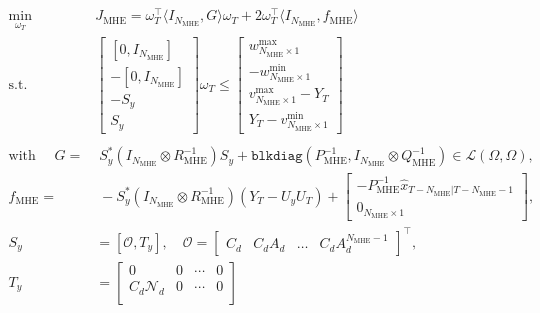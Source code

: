 \begin{equation} \label{eq:MHE_QP}
    \begin{aligned}
        \min_{\omega_T} \quad & J_{\mathrm{MHE}} = \omega_T^\top \langle I_{N_{\mathrm{MHE}}}, G \rangle \omega_T + 2 \omega_T^\top \langle I_{N_{\mathrm{MHE}}}, f_{\mathrm{MHE}} \rangle \\
        \text{s.t.} \quad &
        \begin{bmatrix}
        [0 , I_{N_{\mathrm{MHE}}}] \\
        -[0 , I_{N_{\mathrm{MHE}}}] \\
        -S_y \\
        S_y
        \end{bmatrix}
        \omega_T
        \leq
        \begin{bmatrix}
        w^{\max}_{{N_{\mathrm{MHE}}} \times 1} \\
        -w^{\min}_{{N_{\mathrm{MHE}}} \times 1} \\
        v^{\max}_{{N_{\mathrm{MHE}}} \times 1} - Y_T \\
        Y_T - v^{\min}_{{N_{\mathrm{MHE}}} \times 1}
        \end{bmatrix} \\
        \\
        \text{with } \quad
        G = &\; S_y^\ast (I_{N_{\mathrm{MHE}}} \otimes R_{\mathrm{MHE}}^{-1}) S_y + \texttt{blkdiag}(P_{\mathrm{MHE}}^{-1}, I_{N_{\mathrm{MHE}}} \otimes Q_{\mathrm{MHE}}^{-1}) \in \mathcal{L}(\Omega,\Omega), \\[1ex]
        f_{\mathrm{MHE}} = &\; -S_y^\ast (I_{N_{\mathrm{MHE}}} \otimes R_{\mathrm{MHE}}^{-1}) (Y_T - U_y U_T) + 
        \begin{bmatrix}
        -P_{\mathrm{MHE}}^{-1} \hat{x}_{T-{N_{\mathrm{MHE}}}|T-{N_{\mathrm{MHE}}}-1} \\
        0_{{N_{\mathrm{MHE}}} \times 1}
        \end{bmatrix}, \\[1ex]
        S_y &= [\mathcal{O}, T_y], \quad
        \mathcal{O} = 
        \begin{bmatrix}
        C_d &
        C_d A_d &
        \hdots &
        C_d A_d^{{N_{\mathrm{MHE}}}-1}
        \end{bmatrix}^\top, \\[1ex]
        T_y &=
        \begin{bmatrix}
        0 & 0 & \cdots & 0 \\
        C_d \mathcal{N}_d & 0 & \cdots & 0 \\

\end{bmatrix}
\end{aligned}
\end{equation}
